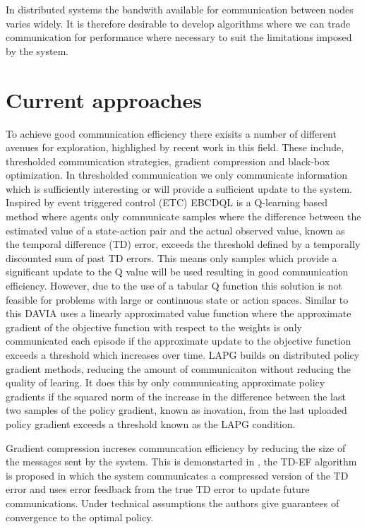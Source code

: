In distributed systems the bandwith available for communication between nodes varies widely. It is therefore desirable to develop algorithms where we can trade communication for performance where necessary to suit the limitations imposed by the system.

\section{Current approaches}
\label{sec:CurrentApproaches}
To achieve good communication efficiency there exisits a number of different avenues for exploration, highlighed by recent work in this field. These include, thresholded communication strategies, gradient compression and black-box optimization.
In thresholded communication we only communicate information which is sufficiently interesting or will provide a sufficient update to the system. Inspired by event triggered control (ETC) EBCDQL \cite{EBCDQL} is a Q-learning based method where agents only communicate samples where the difference between the estimated value of a state-action pair and the actual observed value, known as the temporal difference (TD) error, exceeds the threshold defined by a temporally discounted sum of past TD errors. This means only samples which provide a significant update to the Q value will be used resulting in good communication efficiency. 
However, due to the use of a tabular Q function this solution is not feasible for problems with large or continuous state or action spaces.
Similar to this DAVIA \cite{DAVIA} uses a linearly approximated value function where the approximate gradient of the objective function with respect to the weights is only communicated each episode if the approximate update to the objective function exceeds a threshold which increases over time. 
LAPG \cite{LAPG} builds on distributed policy gradient methods, reducing the amount of communicaiton without reducing the quality of learing. It does this by only communicating approximate policy gradients if the squared norm of the increase in the difference between the last two samples of the policy gradient, known as inovation, from the last uploaded policy gradient exceeds a threshold known as the LAPG condition.

Gradient compression increses communcation efficiency by reducing the size of the messages sent by the system. This is demonstarted in \cite{TDCompression}, the TD-EF algorithm is proposed in which the system communicates a compressed version of the TD error and uses error feedback from the true TD error to update future communications. Under technical assumptions the authors give guarantees of convergence to the optimal policy.

